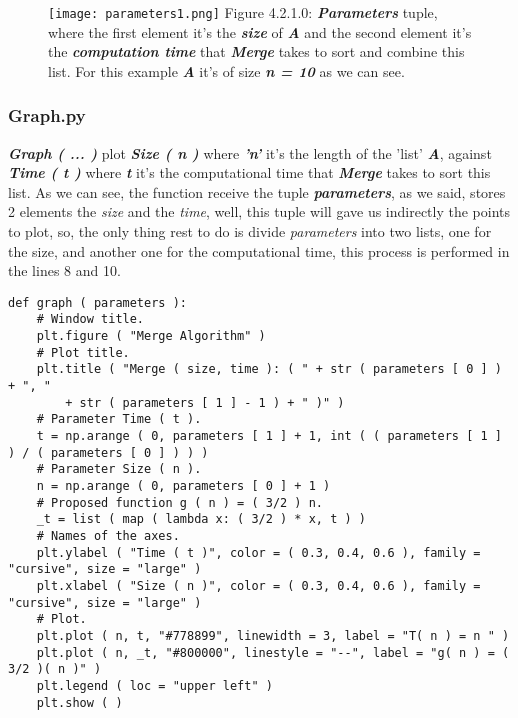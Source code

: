 \begin{figure}[H]
\texttt{[image: parameters1.png]}
\centering \linebreak \linebreak Figure 4.2.1.0: {\bfseries\itshape Parameters} tuple, where the first element it's the {\bfseries\itshape size} of {\bfseries\itshape A} and the second element it's the {\bfseries\itshape computation time} that {\bfseries\itshape Merge} takes to sort and combine this list. For this example {\bfseries\itshape A} it's of size {\bfseries\itshape n = 10} as we can see.
\end{figure}
  
\pagebreak

\subsubsection{Graph.py}

{\bfseries\itshape Graph ( ... )} plot {\bfseries\itshape Size ( n )} where {\bfseries\itshape 'n'} it's the length of the 'list' {\bfseries\itshape A}, against {\bfseries\itshape Time ( t )} where {\bfseries\itshape t} it's the computational time that {\bfseries\itshape Merge} takes to sort this list. As we can see, the function receive the tuple {\bfseries\itshape parameters}, as we said, stores 2 elements the {\itshape size} and the {\itshape time}, well, this tuple will gave us indirectly the points to plot, so, the only thing rest to do is divide {\itshape parameters} into two lists, one for the size, and another one for the computational time, this process is performed in the lines 8 and 10.  \hfill \break

\begin{lstlisting}
def graph ( parameters ):
    # Window title.
    plt.figure ( "Merge Algorithm" )
    # Plot title.
    plt.title ( "Merge ( size, time ): ( " + str ( parameters [ 0 ] ) + ", " 
    	+ str ( parameters [ 1 ] - 1 ) + " )" )
    # Parameter Time ( t ).
    t = np.arange ( 0, parameters [ 1 ] + 1, int ( ( parameters [ 1 ] ) / ( parameters [ 0 ] ) ) )
    # Parameter Size ( n ).
    n = np.arange ( 0, parameters [ 0 ] + 1 )
    # Proposed function g ( n ) = ( 3/2 ) n.
    _t = list ( map ( lambda x: ( 3/2 ) * x, t ) )
    # Names of the axes.
    plt.ylabel ( "Time ( t )", color = ( 0.3, 0.4, 0.6 ), family = "cursive", size = "large" )
    plt.xlabel ( "Size ( n )", color = ( 0.3, 0.4, 0.6 ), family = "cursive", size = "large" )
    # Plot.
    plt.plot ( n, t, "#778899", linewidth = 3, label = "T( n ) = n " )
    plt.plot ( n, _t, "#800000", linestyle = "--", label = "g( n ) = ( 3/2 )( n )" )
    plt.legend ( loc = "upper left" )
    plt.show ( )
\end{lstlisting} \hfill

